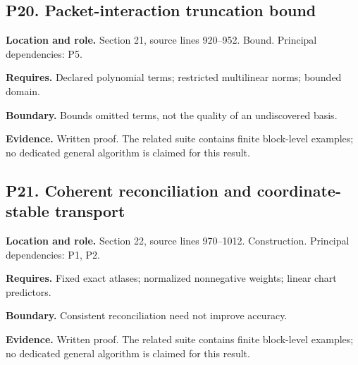 \documentclass[11pt,oneside,openany]{book}
\numberwithin{equation}{section}
\begin{document}
\par\noindent\begin{minipage}{\textwidth}
\subsection{P20. Packet-interaction truncation
bound}\label{LSMRegister:p20.-packet-interaction-truncation-bound}

\textbf{Location and role.} Section 21, source lines 920--952. Bound.
Principal dependencies: P5.

\textbf{Requires.} Declared polynomial terms; restricted multilinear
norms; bounded domain.

\textbf{Boundary.} Bounds omitted terms, not the quality of an
undiscovered basis.

\textbf{Evidence.} Written proof. The related suite contains finite
block-level examples; no dedicated general algorithm is claimed for this
result.
\end{minipage}\par\medskip

\par\noindent\begin{minipage}{\textwidth}
\subsection{P21. Coherent reconciliation and coordinate-stable
transport}\label{LSMRegister:p21.-coherent-reconciliation-and-coordinate-stable-transport}

\textbf{Location and role.} Section 22, source lines 970--1012.
Construction. Principal dependencies: P1, P2.

\textbf{Requires.} Fixed exact atlases; normalized nonnegative weights;
linear chart predictors.

\textbf{Boundary.} Consistent reconciliation need not improve accuracy.

\textbf{Evidence.} Written proof. The related suite contains finite
block-level examples; no dedicated general algorithm is claimed for this
result.
\end{minipage}\par\medskip
\end{document}
